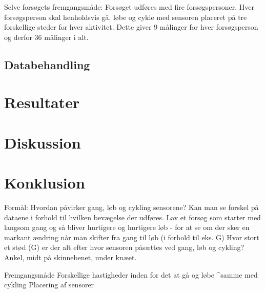 Selve forsøgets fremgangsmåde:
Forsøget udføres med fire forsøgspersoner. Hver forsøgsperson skal henholdsvis gå, løbe og cykle med sensoren placeret på tre forskellige steder for hver aktivitet. Dette giver 9 målinger for hver forsøgsperson og derfor 36 målinger i alt. 

\subsection{Databehandling}

\section{Resultater}

\section{Diskussion}

\section{Konklusion}

Formål: 
Hvordan påvirker gang, løb og cykling sensorene? 
Kan man se forskel på dataene i forhold til hvilken bevægelse der udføres.
Lav et forsøg som starter med langsom gang og så bliver hurtigere og hurtigere løb - for at se om der sker en markant ændring når man skifter fra gang til løb (i forhold til eks. G)
Hvor stort et stød (G) er der alt efter hvor sensoren påsættes ved gang, løb og cykling?
Ankel, midt på skinnebenet, under knæet.


Fremgangsmåde
Forskellige hastigheder inden for det at gå og løbe 
^samme med cykling
Placering af sensorer
